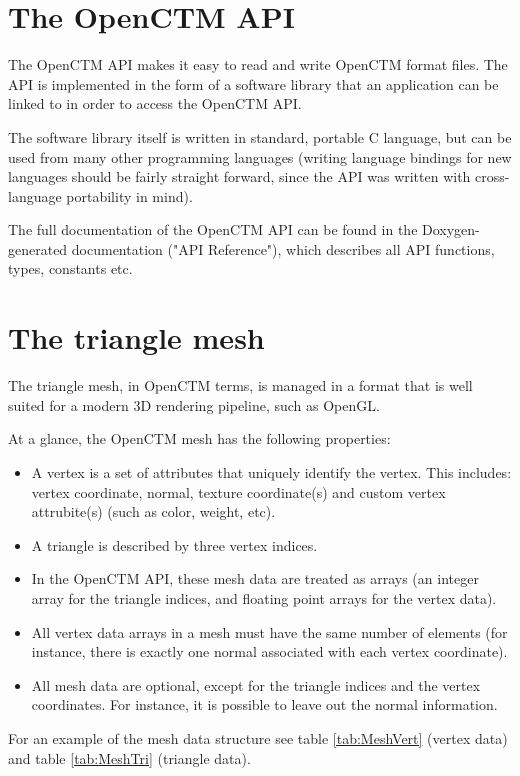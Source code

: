 \section{The OpenCTM API}
The OpenCTM API makes it easy to read and write OpenCTM format files. The API is
implemented in the form of a software library that an application can be linked
to in order to access the OpenCTM API.

The software library itself is written in standard, portable C language, but
can be used from many other programming languages (writing language bindings
for new languages should be fairly straight forward, since the API was written
with cross-language portability in mind).

The full documentation of the OpenCTM API can be found in the Doxygen-generated
documentation ("API Reference"), which describes all API functions, types,
constants etc.


\section{The triangle mesh}
The triangle mesh, in OpenCTM terms, is managed in a format that is well suited
for a modern 3D rendering pipeline, such as OpenGL.

At a glance, the OpenCTM mesh has the following properties:

\begin{itemize}
    \item A vertex is a set of attributes that uniquely identify the vertex.
          This includes: vertex coordinate, normal, texture coordinate(s) and
          custom vertex attrubite(s) (such as color, weight, etc).
    \item A triangle is described by three vertex indices.
    \item In the OpenCTM API, these mesh data are treated as arrays (an integer
          array for the triangle indices, and floating point arrays for the
          vertex data).
    \item All vertex data arrays in a mesh must have the same number of elements
          (for instance, there is exactly one normal associated with each
          vertex coordinate).
    \item All mesh data are optional, except for the triangle indices and the
          vertex coordinates. For instance, it is possible to leave out the
          normal information.
\end{itemize}

For an example of the mesh data structure see table \ref{tab:MeshVert} (vertex
data) and table \ref{tab:MeshTri} (triangle data).

